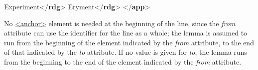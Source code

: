 \begin{shaded}
Experiment{</\textbf{rdg}>}\mbox{}\newline 
{}Eryment{</\textbf{rdg}>}\mbox{}\newline 
{</\textbf{app}>}\end{shaded}\egroup\par \noindent  No \hyperref[TEI.anchor]{<anchor>} element is needed at the beginning of the line, since the {\itshape from} attribute can use the identifier for the line as a whole; the lemma is assumed to run from the beginning of the element indicated by the {\itshape from} attribute, to the end of that indicated by the {\itshape to} attribute. If no value is given for {\itshape to}, the lemma runs from the beginning to the end of the element indicated by the {\itshape from} attribute.\par
